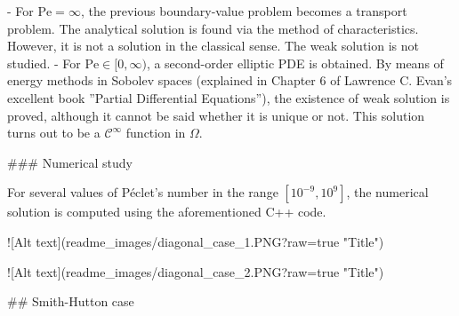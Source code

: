 - For $\mathrm{Pe} = \infty$, the previous boundary-value problem becomes a transport problem. The analytical solution is found via the method of characteristics. However, it is not a solution in the classical sense. The weak solution is not studied.
- For $\mathrm{Pe} \in [0,\infty)$, a second-order elliptic PDE is obtained. By means of energy methods in Sobolev spaces (explained in Chapter 6 of Lawrence C. Evan's excellent book ''Partial Differential Equations''), the existence of weak solution is proved, although it cannot be said whether it is unique or not. This solution turns out to be a $\mathcal{C}^\infty$ function in $\Omega$.

### Numerical study

For several values of Péclet's number in the range $[10^{-9}, 10^9]$, the numerical solution is computed using the aforementioned C++ code. 

![Alt text](readme_images/diagonal_case_1.PNG?raw=true "Title")

![Alt text](readme_images/diagonal_case_2.PNG?raw=true "Title")

## Smith-Hutton case










